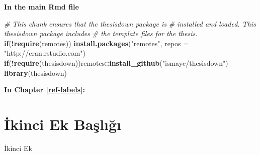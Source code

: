 \documentclass[12pt,twoside]{deuthesis}
\newenvironment{Shaded}{\begin{snugshade}}{\end{snugshade}}
\newcommand{\AttributeTok}[1]{\textcolor[rgb]{0.13,0.29,0.53}{#1}}
\newcommand{\CommentTok}[1]{\textcolor[rgb]{0.56,0.35,0.01}{\textit{#1}}}
\newcommand{\ControlFlowTok}[1]{\textcolor[rgb]{0.13,0.29,0.53}{\textbf{#1}}}
\newcommand{\FunctionTok}[1]{\textcolor[rgb]{0.13,0.29,0.53}{\textbf{#1}}}
\newcommand{\NormalTok}[1]{#1}
\newcommand{\SpecialCharTok}[1]{\textcolor[rgb]{0.81,0.36,0.00}{\textbf{#1}}}
\newcommand{\StringTok}[1]{\textcolor[rgb]{0.31,0.60,0.02}{#1}}
\begin{document}
\textbf{In the main Rmd file}

\begin{Shaded}
\begin{Highlighting}[]
\CommentTok{\# This chunk ensures that the thesisdown package is}
\CommentTok{\# installed and loaded. This thesisdown package includes}
\CommentTok{\# the template files for the thesis.}
\ControlFlowTok{if}\NormalTok{(}\SpecialCharTok{!}\FunctionTok{require}\NormalTok{(remotes)) }\FunctionTok{install.packages}\NormalTok{(}\StringTok{"remotes"}\NormalTok{, }\AttributeTok{repos =} \StringTok{"http://cran.rstudio.com"}\NormalTok{)}
\ControlFlowTok{if}\NormalTok{(}\SpecialCharTok{!}\FunctionTok{require}\NormalTok{(thesisdown))remotes}\SpecialCharTok{::}\FunctionTok{install\_github}\NormalTok{(}\StringTok{"ismayc/thesisdown"}\NormalTok{)}
\FunctionTok{library}\NormalTok{(thesisdown)}
\end{Highlighting}
\end{Shaded}

\textbf{In Chapter \ref{ref-labels}:}

\hypertarget{ikinci-ek-baux15flux131ux11fux131}{%
\chapter{İkinci Ek Başlığı}\label{ikinci-ek-baux15flux131ux11fux131}}

İkinci Ek
\end{document}
